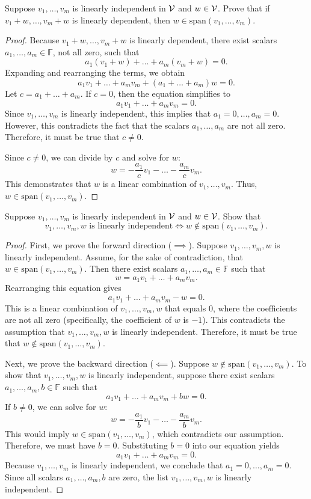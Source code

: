 \begin{question}
	Suppose $v_1, \dots, v_m$ is linearly independent in $\mathcal{V}$ and $w \in \mathcal{V}$. Prove that if $v_1 + w, \dots, v_m + w$ is linearly dependent, then $w \in \text{span}(v_1, \dots, v_m)$.
\end{question}
\begin{proof}
	Because $v_1 + w, \dots, v_m + w$ is linearly dependent, there exist scalars $a_1, \dots, a_m \in \mathbb{F}$, not all zero, such that
	\[
	a_1(v_1 + w) + \dots + a_m(v_m + w) = 0.
	\]
	Expanding and rearranging the terms, we obtain
	\[
	a_1 v_1 + \dots + a_m v_m + (a_1 + \dots + a_m)w = 0.
	\]
	Let $c = a_1 + \dots + a_m$. If $c = 0$, then the equation simplifies to
	\[
	a_1 v_1 + \dots + a_m v_m = 0.
	\]
	Since $v_1, \dots, v_m$ is linearly independent, this implies that $a_1 = 0, \dots, a_m = 0$. However, this contradicts the fact that the scalars $a_1, \dots, a_m$ are not all zero. Therefore, it must be true that $c \neq 0$. 
	
	Since $c \neq 0$, we can divide by $c$ and solve for $w$:
	\[
	w = -\frac{a_1}{c}v_1 - \dots - \frac{a_m}{c}v_m.
	\]
	This demonstrates that $w$ is a linear combination of $v_1, \dots, v_m$. Thus, $w \in \text{span}(v_1, \dots, v_m)$.
\end{proof}
\begin{question}
	Suppose $v_1, \dots, v_m$ is linearly independent in $\mathcal{V}$ and $w \in \mathcal{V}$. Show that
	\[
	v_1, \dots, v_m, w \text{ is linearly independent} \iff w \notin \text{span}(v_1, \dots, v_m).
	\]
\end{question}
\begin{proof}
	First, we prove the forward direction ($\implies$). Suppose $v_1, \dots, v_m, w$ is linearly independent. Assume, for the sake of contradiction, that $w \in \text{span}(v_1, \dots, v_m)$. Then there exist scalars $a_1, \dots, a_m \in \mathbb{F}$ such that
	\[
	w = a_1 v_1 + \dots + a_m v_m.
	\]
	Rearranging this equation gives
	\[
	a_1 v_1 + \dots + a_m v_m - w = 0.
	\]
	This is a linear combination of $v_1, \dots, v_m, w$ that equals $0$, where the coefficients are not all zero (specifically, the coefficient of $w$ is $-1$). This contradicts the assumption that $v_1, \dots, v_m, w$ is linearly independent. Therefore, it must be true that $w \notin \text{span}(v_1, \dots, v_m)$.
	
	Next, we prove the backward direction ($\impliedby$). Suppose $w \notin \text{span}(v_1, \dots, v_m)$. To show that $v_1, \dots, v_m, w$ is linearly independent, suppose there exist scalars $a_1, \dots, a_m, b \in \mathbb{F}$ such that
	\[
	a_1 v_1 + \dots + a_m v_m + b w = 0.
	\]
	If $b \neq 0$, we can solve for $w$:
	\[
	w = -\frac{a_1}{b} v_1 - \dots - \frac{a_m}{b} v_m.
	\]
	This would imply $w \in \text{span}(v_1, \dots, v_m)$, which contradicts our assumption. Therefore, we must have $b = 0$. Substituting $b = 0$ into our equation yields
	\[
	a_1 v_1 + \dots + a_m v_m = 0.
	\]
	Because $v_1, \dots, v_m$ is linearly independent, we conclude that $a_1 = 0, \dots, a_m = 0$. Since all scalars $a_1, \dots, a_m, b$ are zero, the list $v_1, \dots, v_m, w$ is linearly independent.
\end{proof}
